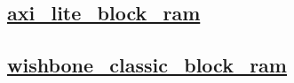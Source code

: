 \documentclass{article}
\begin{document}
  


  \subsection{\href{../files/axi_lite_block_ram-v.html}{axi\_lite\_block\_ram}}

  \subsection{\href{../files/wishbone_classic_block_ram-v.html}{wishbone\_classic\_block\_ram}}
\end{document}

